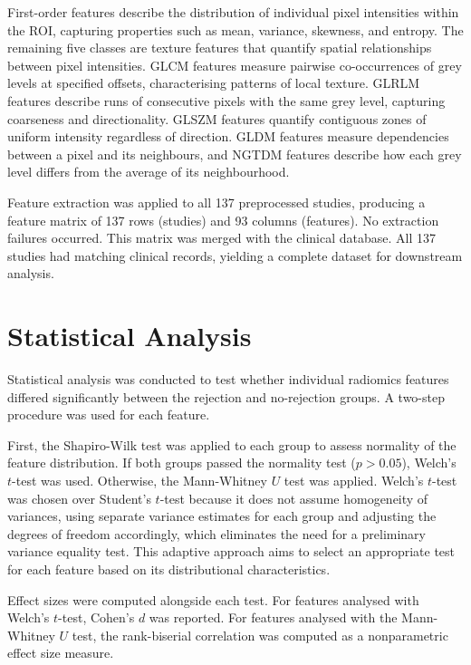 First-order features describe the distribution of individual pixel intensities within the ROI, capturing properties such as mean, variance, skewness, and entropy. The remaining five classes are texture features that quantify spatial relationships between pixel intensities. GLCM features measure pairwise co-occurrences of grey levels at specified offsets, characterising patterns of local texture. GLRLM features describe runs of consecutive pixels with the same grey level, capturing coarseness and directionality. GLSZM features quantify contiguous zones of uniform intensity regardless of direction. GLDM features measure dependencies between a pixel and its neighbours, and NGTDM features describe how each grey level differs from the average of its neighbourhood.

Feature extraction was applied to all 137 preprocessed studies, producing a feature matrix of 137 rows (studies) and 93 columns (features). No extraction failures occurred. This matrix was merged with the clinical database. All 137 studies had matching clinical records, yielding a complete dataset for downstream analysis.


\section{Statistical Analysis}
\label{sec:statistical_analysis}

Statistical analysis was conducted to test whether individual radiomics features differed significantly between the rejection and no-rejection groups. A two-step procedure was used for each feature.

First, the Shapiro-Wilk test was applied to each group to assess normality of the feature distribution. If both groups passed the normality test ($p > 0.05$), Welch's $t$-test was used. Otherwise, the Mann-Whitney $U$ test was applied. Welch's $t$-test was chosen over Student's $t$-test because it does not assume homogeneity of variances, using separate variance estimates for each group and adjusting the degrees of freedom accordingly, which eliminates the need for a preliminary variance equality test. This adaptive approach aims to select an appropriate test for each feature based on its distributional characteristics.

Effect sizes were computed alongside each test. For features analysed with Welch's $t$-test, Cohen's $d$ was reported. For features analysed with the Mann-Whitney $U$ test, the rank-biserial correlation was computed as a nonparametric effect size measure.

